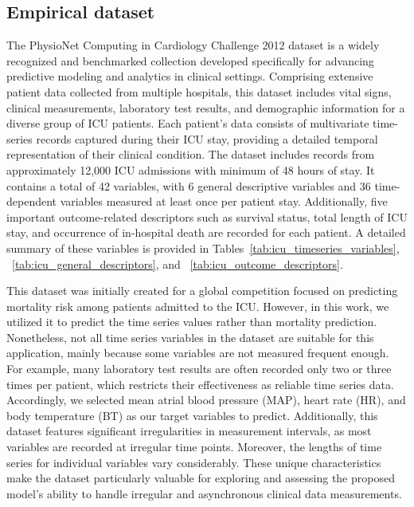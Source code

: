 \documentclass[preprint,12pt]{elsarticle}
\begin{document}
\subsection{Empirical dataset}
\label{appndx:empirical_dataset}
The PhysioNet Computing in Cardiology Challenge 2012 dataset is a widely recognized and benchmarked collection developed specifically for advancing predictive modeling and analytics in clinical settings. Comprising extensive patient data collected from multiple hospitals, this dataset includes vital signs, clinical measurements, laboratory test results, and demographic information for a diverse group of ICU patients. Each patient's data consists of multivariate time-series records captured during their ICU stay, providing a detailed temporal representation of their clinical condition. The dataset includes records from approximately 12,000 ICU admissions with minimum of 48 hours of stay. It contains a total of 42 variables, with 6 general descriptive variables and 36 time-dependent variables measured at least once per patient stay. Additionally, five important outcome-related descriptors such as survival status, total length of ICU stay, and occurrence of in-hospital death are recorded for each patient. A detailed summary of these variables is provided in Tables~\ref{tab:icu_timeseries_variables}, ~\ref{tab:icu_general_descriptors}, and ~\ref{tab:icu_outcome_descriptors}.

This dataset was initially created for a global competition focused on predicting mortality risk among patients admitted to the ICU. However, in this work, we utilized it to predict the time series values rather than mortality prediction. Nonetheless, not all time series variables in the dataset are suitable for this application, mainly because some variables are not measured frequent enough. For example, many laboratory test results are often recorded only two or three times per patient, which restricts their effectiveness as reliable time series data. Accordingly, we selected mean atrial blood pressure (MAP), heart rate (HR), and body temperature (BT) as our target variables to predict. Additionally, this dataset features significant irregularities in measurement intervals, as most variables are recorded at irregular time points. Moreover, the lengths of time series for individual variables vary considerably. These unique characteristics make the dataset particularly valuable for exploring and assessing the proposed model's ability to handle irregular and asynchronous clinical data measurements.
\end{document}
